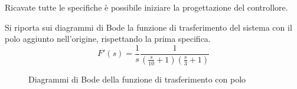 Ricavate tutte le specifiche è possibile iniziare la progettazione del controllore.

Si riporta sui diagrammi di Bode la funzione di trasferimento del sistema con
il polo aggiunto nell'origine, rispettando la prima specifica.
$$
    F'(s) = \frac{1}{s}\frac{1}{\left(\frac{s}{10}+1\right)\left(\frac{s}{3}+1\right)}
$$

\begin{figure}[h]
    \centering
    \caption{Diagrammi di Bode della funzione di trasferimento con polo}
    \label{fig:bode_es_2}
\end{figure}

